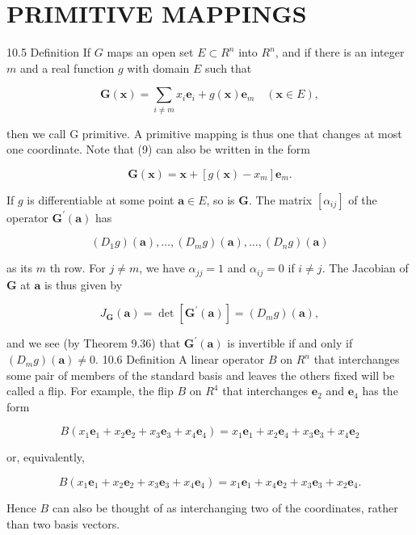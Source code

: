 \documentclass[10pt]{article}
\begin{document}
\section{PRIMITIVE MAPPINGS}
10.5 Definition If $G$ maps an open set $E \subset R^{n}$ into $R^{n}$, and if there is an integer $m$ and a real function $g$ with domain $E$ such that

$$
\mathbf{G}(\mathbf{x})=\sum_{i \neq m} x_{i} \mathbf{e}_{i}+g(\mathbf{x}) \mathbf{e}_{m} \quad(\mathbf{x} \in E),
$$

then we call G primitive. A primitive mapping is thus one that changes at most one coordinate. Note that (9) can also be written in the form

$$
\mathbf{G}(\mathbf{x})=\mathbf{x}+\left[g(\mathbf{x})-x_{m}\right] \mathbf{e}_{m} .
$$

If $g$ is differentiable at some point $\mathbf{a} \in E$, so is $\mathbf{G}$. The matrix $\left[\alpha_{i j}\right]$ of the operator $\mathbf{G}^{\prime}(\mathbf{a})$ has

$$
\left(D_{1} g\right)(\mathbf{a}), \ldots,\left(D_{m} g\right)(\mathbf{a}), \ldots,\left(D_{n} g\right)(\mathbf{a})
$$

as its $m$ th row. For $j \neq m$, we have $\alpha_{j j}=1$ and $\alpha_{i j}=0$ if $i \neq j$. The Jacobian of $\mathbf{G}$ at $\mathbf{a}$ is thus given by

$$
J_{\mathbf{G}}(\mathbf{a})=\operatorname{det}\left[\mathbf{G}^{\prime}(\mathbf{a})\right]=\left(D_{m} g\right)(\mathbf{a}),
$$

and we see (by Theorem 9.36) that $\mathbf{G}^{\prime}(\mathbf{a})$ is invertible if and only if $\left(D_{m} g\right)(\mathbf{a}) \neq 0$. 10.6 Definition A linear operator $B$ on $R^{n}$ that interchanges some pair of members of the standard basis and leaves the others fixed will be called a flip. For example, the flip $B$ on $R^{4}$ that interchanges $\mathbf{e}_{2}$ and $\mathbf{e}_{4}$ has the form

$$
B\left(x_{1} \mathbf{e}_{1}+x_{2} \mathbf{e}_{2}+x_{3} \mathbf{e}_{3}+x_{4} \mathbf{e}_{4}\right)=x_{1} \mathbf{e}_{1}+x_{2} \mathbf{e}_{4}+x_{3} \mathbf{e}_{3}+x_{4} \mathbf{e}_{2}
$$

or, equivalently,

$$
B\left(x_{1} \mathbf{e}_{1}+x_{2} \mathbf{e}_{2}+x_{3} \mathbf{e}_{3}+x_{4} \mathbf{e}_{4}\right)=x_{1} \mathbf{e}_{1}+x_{4} \mathbf{e}_{2}+x_{3} \mathbf{e}_{3}+x_{2} \mathbf{e}_{4} .
$$

Hence $B$ can also be thought of as interchanging two of the coordinates, rather than two basis vectors.
\end{document}
